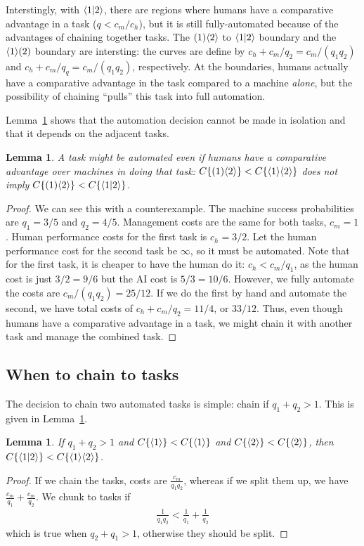 \documentclass{article}
\newtheorem{lemma}[theorem]{Lemma}
\begin{document}
Interstingly, with $\langle 1|2 \rangle$, there are regions where humans have a comparative advantage in a task ($q < c_m/c_h$), but it is still fully-automated because of the advantages of chaining together tasks.
The $( 1 )\langle 2 \rangle$ to $\langle 1|2 \rangle$ boundary and the $\langle 1 \rangle( 2 )$ boundary are intersting:
the curves are define by $c_h + c_m/q_2 = c_m/(q_1q_2)$ and $c_h + c_m/q_q = c_m/(q_1q_2)$, respectively.
At the boundaries, humans actually have a comparative advantage in the task compared to a machine \emph{alone}, but the possibility of chaining ``pulls'' this task into full automation. 

Lemma~\ref{lemma:ce} shows that the automation decision cannot be made in isolation and that it depends on the adjacent tasks.

\begin{lemma} \label{lemma:ce}
A task might be automated even if humans have a comparative advantage over machines in doing that task:
$C\{( 1 )\langle 2 \rangle\} < C\{\langle 1 \rangle\langle 2 \rangle\}$ does not imply $C\{( 1 )\langle 2 \rangle\} < C\{\langle 1|2 \rangle\}$.
\end{lemma}
\begin{proof}
We can see this with a counterexample.
The machine success probabilities are $q_1 = 3/5$ and $q_2 = 4/5$.
Management costs are the same for both tasks, $c_m = 1$.
Human performance costs for the first task is $c_h = 3/2$.
Let the human performance cost for the second task be $\infty$, so it must be automated. 
Note that for the first task, it is cheaper to have the human do it: 
$c_h < c_m / q_1$, as the human cost is just $3/2 = 9/6$ but the AI cost is $5/3 = 10/6$.
However, we fully automate the costs are 
$c_m / (q_1 q_2) = 25/12$. 
If we do the first by hand and automate the second, we have total costs of $c_h + c_m / q_2 = 11/4$, or $33/12$.
Thus, even though humans have a comparative advantage in a task, we might chain it with another task and manage the combined task.
\end{proof}

\subsection{When to chain to tasks}
The decision to chain two automated tasks is simple: chain if $q_1 + q_2 > 1$.
This is given in Lemma~\ref{lemma:chain}.

\begin{lemma} \label{lemma:chain}
If $q_1 + q_2 > 1$ and $C\{ \langle 1 \rangle \} < C\{ \langle 1 \rangle \}$ and $C\{ \langle 2 \rangle \} < C\{ \langle 2 \rangle \}$, then $C\{ \langle 1|2 \rangle \} < C\{ \langle 1 \rangle\langle 2 \rangle \}$.  
\end{lemma}
\begin{proof}
If we chain the tasks, costs are $\frac{c_m}{q_1q_2}$, whereas if we split them up, we have $\frac{c_m}{q_1} + \frac{c_m}{q_2}$.
We chunk to tasks if 
\begin{align}
\frac{1}{q_1 q_2} <\frac{1}{q_1} + \frac{1}{q_2}
\end{align}
which is true when $q_2 + q_1 > 1$, otherwise they should be split. 
\end{proof}
\end{document}
